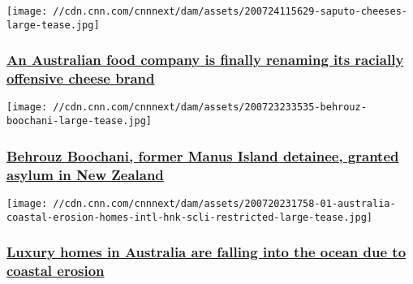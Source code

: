 \href{/2020/07/24/business/australia-cheese-intl-scli/index.html}{}

\texttt{[image: //cdn.cnn.com/cnnnext/dam/assets/200724115629-saputo-cheeses-large-tease.jpg]}

\hypertarget{an-australian-food-company-is-finally-renaming-its-racially-offensive-cheese-brand}{%
\subsubsection{\texorpdfstring{\href{/2020/07/24/business/australia-cheese-intl-scli/index.html}{An
Australian food company is finally renaming its racially offensive
cheese
brand}}{An Australian food company is finally renaming its racially offensive cheese brand}}\label{an-australian-food-company-is-finally-renaming-its-racially-offensive-cheese-brand}}

\href{/2020/07/24/asia/behrouz-boochani-refugee-intl-hnk/index.html}{}

\texttt{[image: //cdn.cnn.com/cnnnext/dam/assets/200723233535-behrouz-boochani-large-tease.jpg]}

\hypertarget{behrouz-boochani-former-manus-island-detainee-granted-asylum-in-new-zealand}{%
\subsubsection{\texorpdfstring{\href{/2020/07/24/asia/behrouz-boochani-refugee-intl-hnk/index.html}{Behrouz
Boochani, former Manus Island detainee, granted asylum in New
Zealand}}{Behrouz Boochani, former Manus Island detainee, granted asylum in New Zealand}}\label{behrouz-boochani-former-manus-island-detainee-granted-asylum-in-new-zealand}}

\href{/2020/07/21/australia/australia-coastal-erosion-homes-intl-hnk-scli/index.html}{}

\texttt{[image: //cdn.cnn.com/cnnnext/dam/assets/200720231758-01-australia-coastal-erosion-homes-intl-hnk-scli-restricted-large-tease.jpg]}

\hypertarget{luxury-homes-in-australia-are-falling-into-the-ocean-due-to-coastal-erosion}{%
\subsubsection{\texorpdfstring{\href{/2020/07/21/australia/australia-coastal-erosion-homes-intl-hnk-scli/index.html}{Luxury
homes in Australia are falling into the ocean due to coastal
erosion}}{Luxury homes in Australia are falling into the ocean due to coastal erosion}}\label{luxury-homes-in-australia-are-falling-into-the-ocean-due-to-coastal-erosion}}

